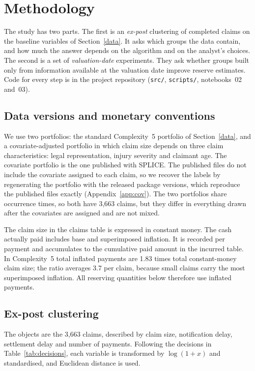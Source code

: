 \section{Methodology}
\label{methodology}

The study has two parts. The first is an \emph{ex-post} clustering of completed claims on the baseline variables of Section~\ref{data}. It asks which groups the data contain, and how much the answer depends on the algorithm and on the analyst's choices. The second is a set of \emph{valuation-date} experiments. They ask whether groups built only from information available at the valuation date improve reserve estimates. Code for every step is in the project repository (\texttt{src/}, \texttt{scripts/}, notebooks~02 and~03).

\subsection{Data versions and monetary conventions}
\label{sec:meth-data}

We use two portfolios: the standard Complexity~5 portfolio of Section~\ref{data}, and a covariate-adjusted portfolio in which claim size depends on three claim characteristics: legal representation, injury severity and claimant age. The covariate portfolio is the one published with SPLICE. The published files do not include the covariate assigned to each claim, so we recover the labels by regenerating the portfolio with the released package versions, which reproduce the published files exactly (Appendix~\ref{app:cov}). The two portfolios share occurrence times, so both have 3,663 claims, but they differ in everything drawn after the covariates are assigned and are not mixed.

The claim size in the claims table is expressed in constant money. The cash actually paid includes base and superimposed inflation. It is recorded per payment and accumulates to the cumulative paid amount in the incurred table. In Complexity~5 total inflated payments are 1.83 times total constant-money claim size; the ratio averages 3.7 per claim, because small claims carry the most superimposed inflation. All reserving quantities below therefore use inflated payments.

\subsection{Ex-post clustering}
\label{sec:meth-expost}

The objects are the 3,663 claims, described by claim size, notification delay, settlement delay and number of payments. Following the decisions in Table~\ref{tab:decisions}, each variable is transformed by $\log(1+x)$ and standardised, and Euclidean distance is used.

